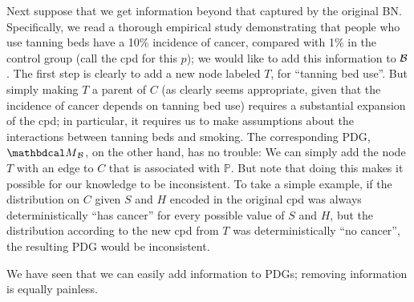 \begin{example}[emulating a BN]
Next suppose that we get information beyond that captured by the original BN.
Specifically, we read a thorough empirical study demonstrating that people who
use tanning beds have a 10\% incidence of cancer, compared with 1\% in the
control group 
(call the cpd for this $p$); we would like to add this information to
$\cal B$. The first step is clearly to add a new node labeled $T$, for ``tanning
bed use''.  But simply making $T$ a parent of $C$ (as clearly seems appropriate,
given that the incidence of cancer depends on tanning bed use) requires a
substantial expansion of the cpd; in particular, it requires us to make
assumptions about the interactions between tanning beds and smoking.  
The corresponding PDG, $\PDGof{{\mathcal B}}$, on the other hand, has no
trouble: We can simply add the node $T$ with an edge to $C$ that is associated
with $\mathbb P$.  But note that doing this makes it possible for our knowledge to
be inconsistent. To take a simple example, if the distribution on $C$ given $S$
and $H$ encoded in the original cpd was always deterministically ``has cancer''
for every possible value of $S$ and $H$, but the distribution according to the
new cpd from $T$ was deterministically ``no cancer'', the resulting PDG would be
inconsistent.  
\end{example}


We have seen that we can easily add information to PDGs; removing information is
equally painless.   

